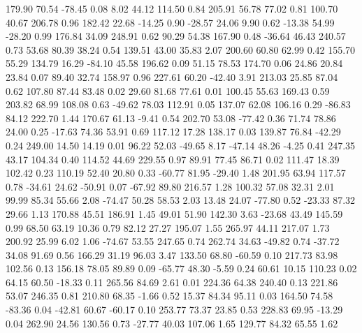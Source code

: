  179.90   70.54  -78.45    0.08
    8.02   44.12  114.50    0.84
  205.91   56.78   77.02    0.81
  100.70   40.67  206.78    0.96
  182.42   22.68  -14.25    0.90
  -28.57   24.06    9.90    0.62
  -13.38   54.99  -28.20    0.99
  176.84   34.09  248.91    0.62
   90.29   54.38  167.90    0.48
  -36.64   46.43  240.57    0.73
   53.68   80.39   38.24    0.54
  139.51   43.00   35.83    2.07
  200.60   60.80   62.99    0.42
  155.70   55.29  134.79   16.29
  -84.10   45.58  196.62    0.09
   51.15   78.53  174.70    0.06
   24.86   20.84   23.84    0.07
   89.40   32.74  158.97    0.96
  227.61   60.20  -42.40    3.91
  213.03   25.85   87.04    0.62
  107.80   87.44   83.48    0.02
   29.60   81.68   77.61    0.01
  100.45   55.63  169.43    0.59
  203.82   68.99  108.08    0.63
  -49.62   78.03  112.91    0.05
  137.07   62.08  106.16    0.29
  -86.83   84.12  222.70    1.44
  170.67   61.13   -9.41    0.54
  202.70   53.08  -77.42    0.36
   71.74   78.86   24.00    0.25
  -17.63   74.36   53.91    0.69
  117.12   17.28  138.17    0.03
  139.87   76.84  -42.29    0.24
  249.00   14.50   14.19    0.01
   96.22   52.03  -49.65    8.17
  -47.14   48.26   -4.25    0.41
  247.35   43.17  104.34    0.40
  114.52   44.69  229.55    0.97
   89.91   77.45   86.71    0.02
  111.47   18.39  102.42    0.23
  110.19   52.40   20.80    0.33
  -60.77   81.95  -29.40    1.48
  201.95   63.94  117.57    0.78
  -34.61   24.62  -50.91    0.07
  -67.92   89.80  216.57    1.28
  100.32   57.08   32.31    2.01
   99.99   85.34   55.66    2.08
  -74.47   50.28   58.53    2.03
   13.48   24.07  -77.80    0.52
  -23.33   87.32   29.66    1.13
  170.88   45.51  186.91    1.45
   49.01   51.90  142.30    3.63
  -23.68   43.49  145.59    0.99
   68.50   63.19   10.36    0.79
   82.12   27.27  195.07    1.55
  265.97   44.11  217.07    1.73
  200.92   25.99    6.02    1.06
  -74.67   53.55  247.65    0.74
  262.74   34.63  -49.82    0.74
  -37.72   34.08   91.69    0.56
  166.29   31.19   96.03    3.47
  133.50   68.80  -60.59    0.10
  217.73   83.98  102.56    0.13
  156.18   78.05   89.89    0.09
  -65.77   48.30   -5.59    0.24
   60.61   10.15  110.23    0.02
   64.15   60.50  -18.33    0.11
  265.56   84.69    2.61    0.01
  224.36   64.38  240.40    0.13
  221.86   53.07  246.35    0.81
  210.80   68.35   -1.66    0.52
   15.37   84.34   95.11    0.03
  164.50   74.58  -83.36    0.04
  -42.81   60.67  -60.17    0.10
  253.77   73.37   23.85    0.53
  228.83   69.95  -13.29    0.04
  262.90   24.56  130.56    0.73
  -27.77   40.03  107.06    1.65
  129.77   84.32   65.55    1.62
